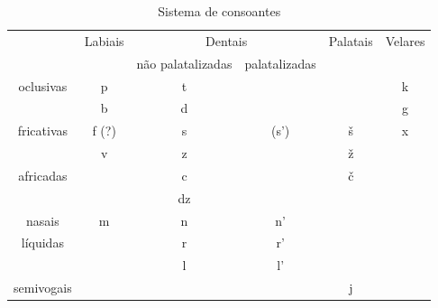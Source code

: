 
\begin{table}[!h]
	\caption{Sistema de consoantes}\label{tab:consoantes}
	\begin{center}
		\begin{tabular}[c]{cccccc}
			\toprule
			           & Labiais & \multicolumn{2}{c}{Dentais} & Palatais      & Velares                  \\
			           &         & não palatalizadas           & palatalizadas & \multicolumn{1}{c}{} &   \\
			\midrule
			oclusivas  & p       & t                           &               &                      & k \\
			           & b       & d                           &               &                      & g \\
			\midrule
			fricativas & f (?)   & s                           & (s')          & š                    & x \\
			           & v       & z                           &               & ž                    &   \\
			\midrule
			africadas  &         & c                           &               & č                    &   \\
			           &         & dz                          &               &                      &   \\
			\midrule
			nasais     & m       & n                           & n'            &                      &   \\
			\midrule
			líquidas   &         & r                           & r'            &                      &   \\
			           &         & l                           & l'            &                      &   \\
			\midrule
			semivogais &         &                             &               & j                    &   \\
			\bottomrule
		\end{tabular}
	\end{center}
\end{table}
